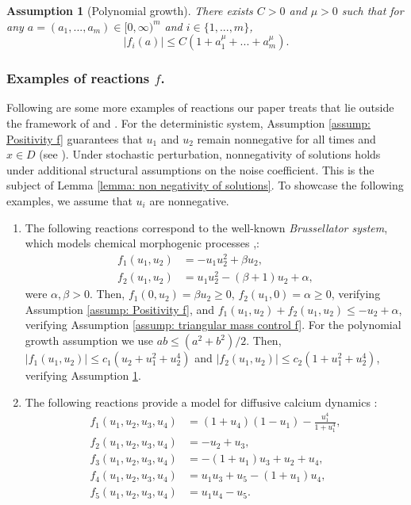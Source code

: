 \documentclass[12pt]{article}
\newtheorem{assumption}{Assumption}
\theoremstyle{definition}
\theoremstyle{remark}
\begin{document}
\begin{assumption}[Polynomial growth]\label{assump: Polynomial growth f}
     There exists $C>0$ and $\mu>0$ such that for any $a = (a_1,...,a_m)\in [0,\infty)^m$ and $i\in \{1,...,m\}$,
\begin{equation}\label{f Polynomial Growth 2x2}
|f_i(a)| \leq C(1+a_1^\mu+...+a_m^\mu).
\end{equation}
\end{assumption}
\subsubsection{Examples of reactions $f$.}\label{subsubsec: Examples f} Following are some more examples of reactions our paper treats that lie outside the framework
of \cite{cerrai2003stochastic} and \cite{salins2021systemsLDP}. For the deterministic system, Assumption \ref{assump: Positivity f} guarantees that $u_1$ and $u_2$ remain nonnegative for all times and $x\in D$ (see \cite{pierre2010global}). Under stochastic perturbation, nonnegativity of solutions holds under additional structural assumptions on the noise coefficient. This is the subject of Lemma \ref{lemma: non negativity of solutions}. To showcase the following examples, we assume that $u_i$ are nonnegative.
\begin{enumerate}
    \item The following reactions correspond to the well-known  \textit{Brussellator system}, which models chemical morphogenic processes \cite{bruss1},\cite{bruss2}:
    \begin{align*}
        f_1(u_1,u_2) &= -u_1u_2^2+\beta u_2,\\
        f_2(u_1,u_2) &= u_1u_2^2-(\beta+1)u_2+\alpha,
    \end{align*}
    were $\alpha,\beta >0$. Then, $f_1(0,u_2) = \beta u_2\geq 0$, $f_2(u_1,0) = \alpha \geq 0$, verifying Assumption  \ref{assump: Positivity f}, and $f_1(u_1,u_2)+f_2(u_1,u_2) \leq -u_2+\alpha$, verifying Assumption \ref{assump: triangular mass control f}. For the polynomial growth assumption we use $ab\leq (a^2+b^2)/2$. Then, $|f_1(u_1,u_2)|\leq c_1(u_2+u_1^2+u_2^4)$ and $|f_2(u_1,u_2)|\leq c_2(1+u_1^2+u_2^4)$, verifying Assumption \ref{assump: Polynomial growth f}.
    \item The following reactions provide a model for diffusive calcium dynamics \cite{application1}:
    \begin{align*}
f_1(u_1,u_2,u_3,u_4) &=
(1 + u_4)(1 - u_1)
- \frac{u_1^4}{1 + u_1^4}, \\[0.5em]
f_2(u_1,u_2,u_3,u_4) &= 
- u_2 + u_3, \\[0.5em]
f_3(u_1,u_2,u_3,u_4) &=
- (1 + u_1) u_3
+ u_2 + u_4, \\[0.5em]
f_4(u_1,u_2,u_3,u_4) &=u_1 u_3 + u_5
- (1+u_1) u_4, \\[0.5em]
f_5(u_1,u_2,u_3,u_4)&=
u_1 u_4 -  u_5.
\end{align*}
\end{enumerate}
\end{document}
